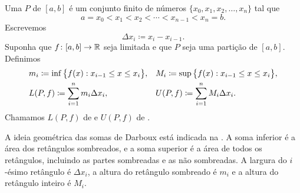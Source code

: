 \begin{defn}
Uma \emph{} $P$ de $[a,b]$ é
um conjunto finito de números $\{ x_0,x_1,x_2,\ldots,x_n \}$ tal que
\begin{equation*}
a = x_0 < x_1 < x_2 < \cdots < x_{n-1} < x_n = b .
\end{equation*}
Escrevemos
\begin{equation*}
\Delta x_i \coloneqq x_i - x_{i-1} .
\end{equation*}
Suponha que $f \colon [a,b] \to {\mathbb{R}}$ seja limitada e que $P$ seja uma partição
de $[a,b]$.
Definimos
\begin{align*}
& m_i \coloneqq \inf \, \bigl\{ f(x) : x_{i-1} \leq x \leq x_i \bigr\} , &
& M_i \coloneqq \sup \, \bigl\{ f(x) : x_{i-1} \leq x \leq x_i \bigr\} , \\
& L(P,f) \coloneqq
\sum_{i=1}^n m_i \Delta x_i , &
& U(P,f) \coloneqq
\sum_{i=1}^n M_i \Delta x_i .
\avoidbreak
\end{align*}
Chamamos $L(P,f)$ de \emph{} e
$U(P,f)$ de \emph{}.
\end{defn}

A ideia geométrica das somas de Darboux está indicada na
. A soma inferior é a área dos retângulos
sombreados, e a soma superior é a área de todos os retângulos, incluindo
as partes sombreadas e as não sombreadas. A largura do $i$-ésimo retângulo é
$\Delta x_i$, a altura do retângulo sombreado é $m_i$ e a altura do retângulo
inteiro é $M_i$.

\begin{myfigureht}
\caption{Exemplos de somas de Darboux.\label{darbouxfig}}
\end{myfigureht}

